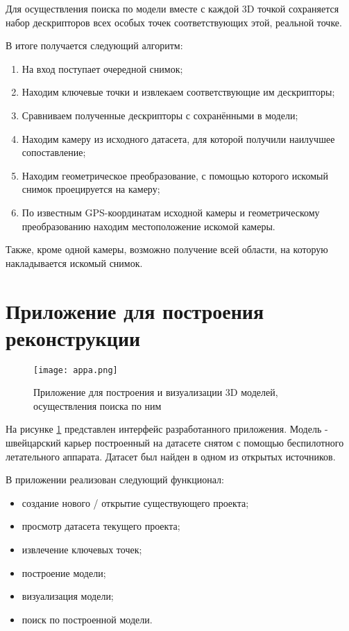 Для осуществления поиска по модели вместе с каждой 3D точкой сохраняется набор дескрипторов всех особых точек соответствующих этой, реальной точке. 

\vspace{1mm}
В итоге получается следующий алгоритм:

\begin{enumerate}
    \item На вход поступает очередной снимок;
    \item Находим ключевые точки и извлекаем соответствующие им дескрипторы;
    \item Сравниваем полученные дескрипторы с сохранёнными в модели;
    \item Находим камеру из исходного датасета, для которой получили наилучшее сопоставление;
    \item Находим геометрическое преобразование, с помощью которого искомый снимок проецируется на  камеру;
    \item По известным GPS-координатам исходной камеры и геометрическому преобразованию находим местоположение искомой камеры.
\end{enumerate}

Также, кроме одной камеры, возможно получение всей области, на которую накладывается искомый снимок.

\section{Приложение для построения реконструкции}

\begin{figure}[h]
    \centering
    \texttt{[image: appa.png]}
    \caption{Приложение для построения и визуализации 3D моделей, осуществления поиска по ним}
    \label{fig:appa}
\end{figure}

На рисунке \ref{fig:appa} представлен интерфейс разработанного приложения. Модель - швейцарский карьер построенный на датасете снятом с помощью беспилотного летательного аппарата. Датасет был найден в одном из открытых источников.

В приложении реализован следующий функционал:

\begin{itemize}
    \item создание нового / открытие существующего проекта;
    \item просмотр датасета текущего проекта;
    \item извлечение ключевых точек;
    \item построение модели;
    \item визуализация модели;
    \item поиск по построенной модели.
\end{itemize}

